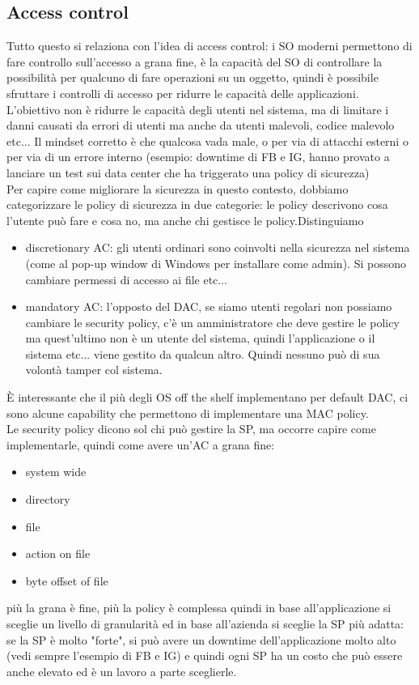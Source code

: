 \documentclass[12pt, oneside]{extbook} %
\begin{document}
\subsection{Access control}
Tutto questo si relaziona con l'idea di access control: i SO moderni permettono di fare controllo sull'accesso a grana fine, è la capacità del SO di controllare la possibilità per qualcuno di fare operazioni su un oggetto, quindi è possibile sfruttare i controlli di accesso per ridurre le capacità delle applicazioni.\\L'obiettivo non è ridurre le capacità degli utenti nel sistema, ma di limitare i danni causati da errori di utenti ma anche da utenti malevoli, codice malevolo etc... Il mindset corretto è che qualcosa vada male, o per via di attacchi esterni o per via di un errore interno (esempio: downtime di FB e IG, hanno provato a lanciare un test sui data center che ha triggerato una policy di sicurezza)\\Per capire come migliorare la sicurezza in questo contesto, dobbiamo categorizzare le policy di sicurezza in due categorie: le policy descrivono cosa l'utente può fare e cosa no, ma anche chi gestisce le policy.Distinguiamo
\begin{itemize}
\item discretionary AC: gli utenti ordinari sono coinvolti nella sicurezza nel sistema (come al pop-up window di Windows per installare come admin). Si possono cambiare permessi di accesso ai file etc...
\item mandatory AC: l'opposto del DAC, se siamo utenti regolari non possiamo cambiare le security policy, c'è un amministratore che deve gestire le policy ma quest'ultimo non è un utente del sistema, quindi l'applicazione o il sistema etc... viene gestito da qualcun altro. Quindi nessuno può di sua volontà tamper col sistema.
\end{itemize}
È interessante che il più degli OS off the shelf implementano per default DAC, ci sono alcune capability che permettono di implementare una MAC policy.\\Le security policy dicono sol chi può gestire la SP, ma occorre capire come implementarle, quindi come avere un'AC a grana fine:
\begin{itemize}
\item system wide
\item directory
\item file
\item action on file
\item byte offset of file
\end{itemize}
più la grana è fine, più la policy è complessa quindi in base all'applicazione si sceglie un livello di granularità ed in base all'azienda si sceglie la SP più adatta: se la SP è molto "forte", si può avere un downtime dell'applicazione molto alto (vedi sempre l'esempio di FB e IG) e quindi ogni SP ha un costo che può essere anche elevato ed è un lavoro a parte sceglierle.
\end{document}
